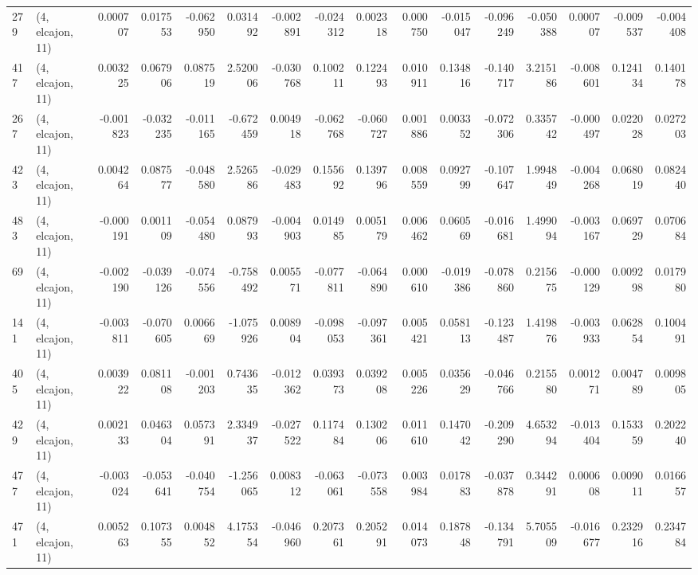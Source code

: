 \begin{tabular}{llrrrrrrrrrrrrrr}
279 &  (4, elcajon, 11) &   0.000707 &  0.017553 & -0.062950 &    0.031492 & -0.002891 &  -0.024312 &  0.002318 &  0.000750 & -0.015047 & -0.096249 &   -0.050388 &  0.000707 & -0.009537 & -0.004408 \\
417 &  (4, elcajon, 11) &   0.003225 &  0.067906 &  0.087519 &    2.520006 & -0.030768 &   0.100211 &  0.122493 &  0.010911 &  0.134816 & -0.140717 &    3.215186 & -0.008601 &  0.124134 &  0.140178 \\
267 &  (4, elcajon, 11) &  -0.001823 & -0.032235 & -0.011165 &   -0.672459 &  0.004918 &  -0.062768 & -0.060727 &  0.001886 &  0.003352 & -0.072306 &    0.335742 & -0.000497 &  0.022028 &  0.027203 \\
423 &  (4, elcajon, 11) &   0.004264 &  0.087577 & -0.048580 &    2.526586 & -0.029483 &   0.155692 &  0.139796 &  0.008559 &  0.092799 & -0.107647 &    1.994849 & -0.004268 &  0.068019 &  0.082440 \\
483 &  (4, elcajon, 11) &  -0.000191 &  0.001109 & -0.054480 &    0.087993 & -0.004903 &   0.014985 &  0.005179 &  0.006462 &  0.060569 & -0.016681 &    1.499094 & -0.003167 &  0.069729 &  0.070684 \\
69  &  (4, elcajon, 11) &  -0.002190 & -0.039126 & -0.074556 &   -0.758492 &  0.005571 &  -0.077811 & -0.064890 &  0.000610 & -0.019386 & -0.078860 &    0.215675 & -0.000129 &  0.009298 &  0.017980 \\
141 &  (4, elcajon, 11) &  -0.003811 & -0.070605 &  0.006669 &   -1.075926 &  0.008904 &  -0.098053 & -0.097361 &  0.005421 &  0.058113 & -0.123487 &    1.419876 & -0.003933 &  0.062854 &  0.100491 \\
405 &  (4, elcajon, 11) &   0.003922 &  0.081108 & -0.001203 &    0.743635 & -0.012362 &   0.039373 &  0.039208 &  0.005226 &  0.035629 & -0.046766 &    0.215580 &  0.001271 &  0.004789 &  0.009805 \\
429 &  (4, elcajon, 11) &   0.002133 &  0.046304 &  0.057391 &    2.334937 & -0.027522 &   0.117484 &  0.130206 &  0.011610 &  0.147042 & -0.209290 &    4.653294 & -0.013404 &  0.153359 &  0.202240 \\
477 &  (4, elcajon, 11) &  -0.003024 & -0.053641 & -0.040754 &   -1.256065 &  0.008312 &  -0.063061 & -0.073558 &  0.003984 &  0.017883 & -0.037878 &    0.344291 &  0.000608 &  0.009011 &  0.016657 \\
471 &  (4, elcajon, 11) &   0.005263 &  0.107355 &  0.004852 &    4.175354 & -0.046960 &   0.207361 &  0.205291 &  0.014073 &  0.187848 & -0.134791 &    5.705509 & -0.016677 &  0.232916 &  0.234784 \\

\end{tabular}
